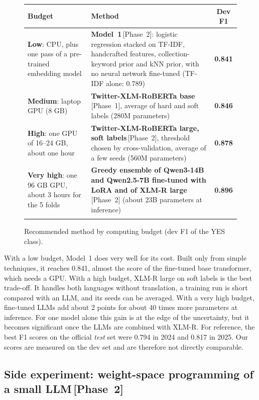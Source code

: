 \documentclass[pdflatex,sn-mathphys-num]{sn-jnl}
\makeatletter
\newenvironment{Htable}{\begin{figure}[H]\def\@captype{table}\begin{center}\begin{threeparttable}\tablebodyfont}{\end{threeparttable}\end{center}\end{figure}}
\newcommand{\Pone}{\,{\normalfont\textsf{\small[Phase~1]}}}
\newcommand{\Ptwo}{\,{\normalfont\textsf{\small[Phase~2]}}}
\makeatother
\begin{document}
\begin{Htable}
\caption{Recommended method by computing budget (dev F1 of the YES class).}\label{tab:budget}
\begin{tabularx}{\textwidth}{@{}>{\raggedright\arraybackslash}p{}>{\raggedright\arraybackslash}Xc@{}}
\toprule
Budget & Method & Dev F1 \\
\midrule
\textbf{Low}: CPU, plus one pass of a pre-trained embedding model & \textbf{Model~1}\Ptwo: logistic regression stacked on TF-IDF, handcrafted features, collection-keyword prior and kNN prior, with no neural network fine-tuned (TF-IDF alone: 0.789) & \textbf{0.841} \\
\textbf{Medium}: laptop GPU (8 GB) & \textbf{Twitter-XLM-RoBERTa base}\Pone, average of hard and soft labels (280M parameters) & \textbf{0.846} \\
\textbf{High}: one GPU of 16--24 GB, about one hour & \textbf{Twitter-XLM-RoBERTa large, soft labels}\Ptwo, threshold chosen by cross-validation, average of a few seeds (560M parameters) & \textbf{0.878} \\
\textbf{Very high}: one 96 GB GPU, about 3 hours for the 5 folds & \textbf{Greedy ensemble of Qwen3-14B and Qwen2.5-7B fine-tuned with LoRA and of XLM-R large}\Ptwo{} (about 23B parameters at inference) & \textbf{0.896} \\
\botrule
\end{tabularx}
\end{Htable}

With a low budget, Model~1 does very well for its cost. Built only from simple techniques, it reaches 0.841, almost the score of the fine-tuned base transformer, which needs a GPU. With a high budget, XLM-R large on soft labels is the best trade-off. It handles both languages without translation, a training run is short compared with an LLM, and its seeds can be averaged. With a very high budget, fine-tuned LLMs add about 2 points for about 40 times more parameters at inference. For one model alone this gain is at the edge of the uncertainty, but it becomes significant once the LLMs are combined with XLM-R. For reference, the best F1 scores on the official \emph{test} set were 0.794 in 2024 and 0.817 in 2025. Our scores are measured on the dev set and are therefore not directly comparable.

\subsection{Side experiment: weight-space programming of a small LLM\Ptwo}\label{sec:wsp}
\end{document}
